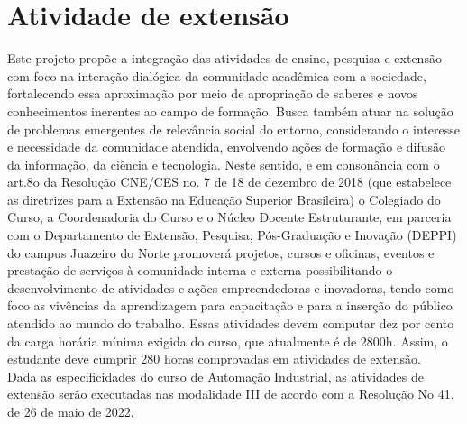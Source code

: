 \chapter{Atividade de extensão}
Este projeto propõe a integração das atividades de ensino, pesquisa e extensão com foco na interação dialógica da comunidade acadêmica com a sociedade, fortalecendo essa aproximação por meio de apropriação de saberes e novos conhecimentos inerentes ao campo de formação. Busca também atuar na solução de problemas emergentes de relevância social do entorno, considerando o interesse e necessidade da comunidade atendida, envolvendo ações de formação e difusão da informação, da ciência e tecnologia. Neste sentido, e em consonância com o art.8o da Resolução CNE/CES no. 7 de 18 de dezembro de 2018 (que estabelece as diretrizes para a Extensão na Educação Superior Brasileira) o Colegiado do Curso, a Coordenadoria do Curso e o Núcleo Docente Estruturante, em parceria com o Departamento de Extensão, Pesquisa, Pós-Graduação e Inovação (DEPPI) do campus Juazeiro do Norte promoverá projetos, cursos e oficinas, eventos e prestação de serviços à comunidade interna e externa possibilitando o desenvolvimento de atividades e ações empreendedoras e inovadoras, tendo como foco as vivências da aprendizagem para capacitação e para a inserção do público atendido ao mundo do trabalho. Essas atividades devem computar dez por cento da carga horária mínima exigida do curso, que atualmente é de 2800h. Assim, o estudante deve cumprir 280 horas comprovadas em atividades de extensão.\\

Dada as especificidades do curso de Automação Industrial, as atividades de extensão serão executadas nas modalidade III de acordo com a Resolução No 41, de 26 de maio de 2022.




